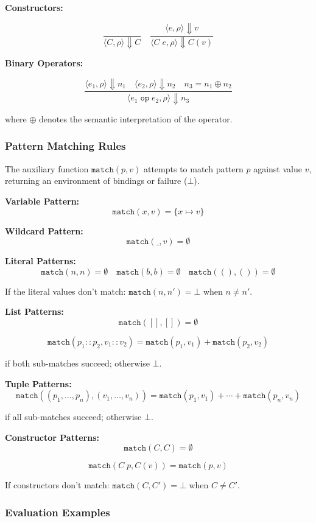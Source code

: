 \documentclass[conference,onecolumn]{IEEEtran}
\begin{document}
\textbf{Constructors:}

$$\frac{}{\langle C, \rho \rangle \Downarrow C}
\quad
\frac{\langle e, \rho \rangle \Downarrow v}{\langle C \; e, \rho \rangle \Downarrow C(v)}$$

\textbf{Binary Operators:}

$$\frac{\langle e_1, \rho \rangle \Downarrow n_1 \quad \langle e_2, \rho \rangle \Downarrow n_2 \quad n_3 = n_1 \oplus n_2}{\langle e_1 \; \texttt{op} \; e_2, \rho \rangle \Downarrow n_3}$$

where $\oplus$ denotes the semantic interpretation of the operator.

\subsubsection{Pattern Matching Rules}

The auxiliary function $\texttt{match}(p, v)$ attempts to match pattern $p$ against value $v$, returning an environment of bindings or failure ($\bot$).

\textbf{Variable Pattern:}
$$\texttt{match}(x, v) = \{x \mapsto v\}$$

\textbf{Wildcard Pattern:}
$$\texttt{match}(\_, v) = \emptyset$$

\textbf{Literal Patterns:}
$$\texttt{match}(n, n) = \emptyset
\quad
\texttt{match}(b, b) = \emptyset
\quad
\texttt{match}((), ()) = \emptyset$$

If the literal values don't match: $\texttt{match}(n, n') = \bot$ when $n \neq n'$.

\textbf{List Patterns:}
$$\texttt{match}([], []) = \emptyset$$

$$\texttt{match}(p_1 :: p_2, v_1 :: v_2) = \texttt{match}(p_1, v_1) + \texttt{match}(p_2, v_2)$$

if both sub-matches succeed; otherwise $\bot$.

\textbf{Tuple Patterns:}
$$\texttt{match}((p_1, \ldots, p_n), (v_1, \ldots, v_n)) = \texttt{match}(p_1, v_1) + \cdots + \texttt{match}(p_n, v_n)$$

if all sub-matches succeed; otherwise $\bot$.

\textbf{Constructor Patterns:}
$$\texttt{match}(C, C) = \emptyset$$

$$\texttt{match}(C \; p, C(v)) = \texttt{match}(p, v)$$

If constructors don't match: $\texttt{match}(C, C') = \bot$ when $C \neq C'$.

\subsubsection{Evaluation Examples}
\end{document}
